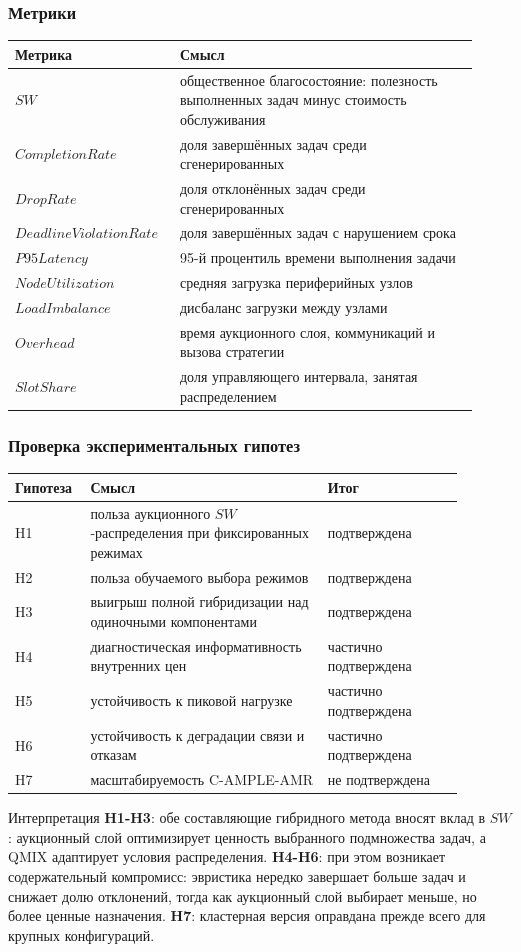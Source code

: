 \begin{frame}
	\frametitle{Метрики}
	\scriptsize
	\begin{tabular}{p{0.31\linewidth}p{0.61\linewidth}}
		\toprule
		\textbf{Метрика} & \textbf{Смысл} \\
		\midrule
		$SW$ & общественное благосостояние: полезность выполненных задач минус стоимость обслуживания \\
		$CompletionRate$ & доля завершённых задач среди сгенерированных \\
		$DropRate$ & доля отклонённых задач среди сгенерированных \\
		$DeadlineViolationRate$ & доля завершённых задач с нарушением срока \\
		$P95Latency$ & 95-й процентиль времени выполнения задачи \\
		$NodeUtilization$ & средняя загрузка периферийных узлов \\
		$LoadImbalance$ & дисбаланс загрузки между узлами \\
		$Overhead$ & время аукционного слоя, коммуникаций и вызова стратегии \\
		$SlotShare$ & доля управляющего интервала, занятая распределением \\
		\bottomrule
	\end{tabular}
\end{frame}

\begin{frame}[shrink=5]
	\frametitle{Проверка экспериментальных гипотез}
	\scriptsize
	\begin{tabular}{p{0.12\linewidth}p{0.49\linewidth}p{0.28\linewidth}}
		\toprule
		\textbf{Гипотеза} & \textbf{Смысл} & \textbf{Итог} \\
		\midrule
		H1 & польза аукционного $SW$-распределения при фиксированных режимах & подтверждена \\
		H2 & польза обучаемого выбора режимов & подтверждена \\
		H3 & выигрыш полной гибридизации над одиночными компонентами & подтверждена \\
		H4 & диагностическая информативность внутренних цен & частично подтверждена \\
		H5 & устойчивость к пиковой нагрузке & частично подтверждена \\
		H6 & устойчивость к деградации связи и отказам & частично подтверждена \\
		H7 & масштабируемость C-AMPLE-AMR & не подтверждена \\
		\bottomrule
	\end{tabular}
	\medskip

	\begin{block}{Интерпретация}
		\textbf{H1-H3}: обе составляющие гибридного метода вносят вклад в $SW$: аукционный слой оптимизирует ценность выбранного подмножества задач, а QMIX адаптирует условия распределения. \textbf{H4-H6}: при этом возникает содержательный компромисс: эвристика нередко завершает больше задач и снижает долю отклонений, тогда как аукционный слой выбирает меньше, но более ценные назначения. \textbf{H7}: кластерная версия оправдана прежде всего для крупных конфигураций.
	\end{block}
\end{frame}
